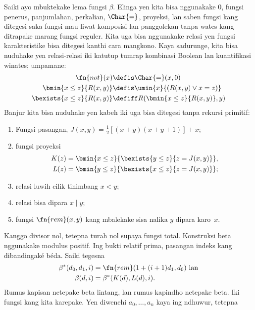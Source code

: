 \documentclass[../../../include/open-logic-section]{subfiles}
\begin{document}
Saiki ayo mbuktekake lema fungsi $\beta$. Elinga yen kita bisa nggunakake
$0$, fungsi penerus, panjumlahan, perkalian, $\Char{=}$, proyeksi, lan
saben fungsi kang ditegesi saka fungsi mau liwat komposisi lan
panggolekan tanpa wates kang ditrapake marang fungsi reguler. Kita uga bisa
nggunakake relasi yen fungsi karakteristike bisa ditegesi kanthi
cara mangkono. Kaya sadurunge, kita bisa nuduhake yen relasi-relasi
iki katutup tumrap kombinasi Boolean lan kuantifikasi winates;
umpamane:
\begin{align*}
\fn{not}(x) & \defis \Char{=}(x,0)\\
\bmin{x \leq z}{R(x,y)} & \defis \umin{x}{(R(x,y) \lor x = z)}\\
\bexists{x \leq z}{R(x,y)} & \defiff R(\bmin{x \leq z}{R(x,y)}, y)
\end{align*}
Banjur kita bisa nuduhake yen kabeh iki uga bisa ditegesi tanpa
rekursi primitif:
\begin{enumerate}
\item Fungsi pasangan, $J(x,y) = \frac{1}{2}[(x+y)(x+y+1)] + x$;
\item fungsi proyeksi
\begin{align*}
K(z) & = \bmin{x \leq z}{\bexists{y \leq z}{z = J(x,y)}},\\
L(z) & = \bmin{y \leq z}{\bexists{x \leq z}{z = J(x,y)}};
\end{align*}
\item relasi luwih cilik tinimbang $x < y$;
\item relasi bisa dipara $x \mid y$;
\item fungsi $\fn{rem}(x,y)$ kang mbalekake sisa nalika
  $y$ dipara karo~$x$.
\end{enumerate}
Kanggo divisor nol, tetepna turah nol supaya fungsi total. Konstruksi beta nggunakake modulus positif. Ing bukti relatif prima, pasangan indeks kang dibandingaké béda.
Saiki tegesna
\begin{align*}
\beta^*(d_0,d_1,i) & = \fn{rem}(1+(i+1) d_1,d_0) \text{ lan}\\
\beta(d,i) & = \beta^*(K(d),L(d),i).
\end{align*}
Rumus kapisan netepake beta lintang, lan rumus kapindho netepake beta. Iki fungsi kang kita karepake. Yen diwenehi $a_0,\dots,a_n$ kaya ing ndhuwur, tetepna
\end{document}
